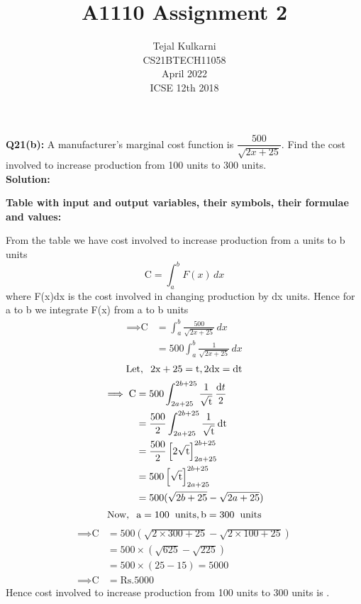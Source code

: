 \documentclass[journal,12pt,two column]{IEEEtran}
\title{A1110 Assignment 2 }
\author{Tejal Kulkarni \\ CS21BTECH11058 \\\vspace*{20pt} April 2022 \\ ICSE 12th 2018 }
\begin{document}
\providecommand{\sbrak}[1]{\ensuremath{{}\left[#1\right]}}
\newcommand{\solution}{\noindent \textbf{Solution: }}
\maketitle

\textbf{ Q21(b):} A manufacturer's marginal cost function is $\dfrac{500}{\sqrt{2x+25}}$. Find the cost involved to increase production from 100 units to 300 units.\\
\solution
\begin{table}[ht!] 
\caption{\textbf{Table with input and output variables, their symbols, their formulae and values:}}
\label{table:1}

\end{table}

From the table we have cost involved to increase production from a units to b units
\begin{equation}
\text{C} = \int_{a}^{b} F(x) \,dx    
\end{equation}
where F(x)dx is the cost involved in changing production by dx units. Hence for a to b we integrate F(x) from a to b units
\begin{align}
\implies \text{C} &= \int_{a}^{b} \frac{500}{\sqrt{2x+25}} \,dx \\
                   &= 500 \int_{a}^{b} \frac{1}{\sqrt{2x+25}} \,dx  
\end{align}
\begin{equation}
\text{Let},\hspace{0.2cm} 2\text{x} + 25 = \text{t}, 2\text{dx} = \text{dt}    
\end{equation}
\begin{align}
\implies \text{C} &= 500 \int_{2a+25}^{2b+25} \frac{1}{\sqrt{\text{t}}} \,\frac{\text dt}{2} \\
&= \frac{500}{2} \int_{2a+25}^{2b+25} \frac{1}{\sqrt{\text{t}}} \,\text{dt} \\
&= \frac{500}{2} \sbrak{2\sqrt{\text{t}}}_{2a+25}^{2b+25} \\
&= 500 \sbrak{\sqrt{\text{t}}}_{2a+25}^{2b+25} \\
&= 500(\sqrt{2b + 25} - \sqrt{2a + 25})
\end{align}
\begin{equation} 
\text{Now},\hspace{0.2cm}\text{a} = 100 \hspace{0.2cm} \text{units} , \text{b} = 300 \hspace{0.2cm} \text{units}
\end{equation}
\begin{align}
\implies \text{C} &= 500(\sqrt{2\times 300+25}-\sqrt{2\times 100+25})\\
                  &= 500\times(\sqrt{625} - \sqrt{225})\\
                  &= 500\times(25 - 15) = 5000 \\
\implies \text{C} &= \text{Rs.}5000
\end{align}
Hence cost involved to increase production from 100 units to 300 units is .
\end{document}
